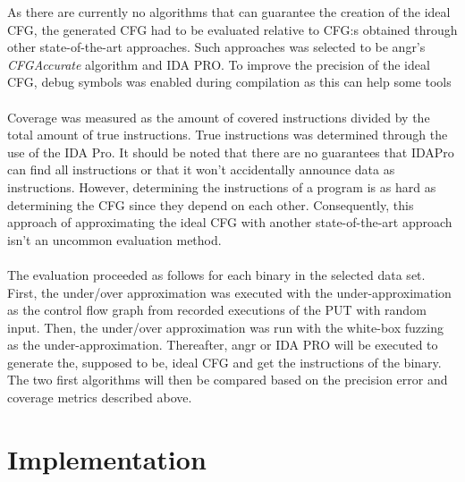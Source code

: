 \documentclass{kththesis}
\begin{document}
\noindent As there are currently no algorithms that can guarantee the creation of the ideal CFG, the generated CFG had to be evaluated relative to CFG:s obtained through other state-of-the-art approaches. Such approaches was selected to be angr's \textit{CFGAccurate} algorithm\cite{angr} and IDA PRO\cite{IDAPro}. To improve the precision of the ideal CFG, debug symbols was enabled during compilation as this can help some tools\cite{alternating}
\\ \\ 
Coverage was measured as the amount of covered instructions divided by the total amount of true instructions. True instructions was determined through the use of the IDA Pro. It should be noted that there are no guarantees that IDAPro can find all instructions or that it won't accidentally announce data as instructions. However, determining the instructions of a program is as hard as determining the CFG since they depend on each other. Consequently, this approach of approximating the ideal CFG with another state-of-the-art approach isn't an uncommon evaluation method\cite{alternating}\cite{preciseCFG}.%
\\ \\
The evaluation proceeded as follows for each binary in the selected data set. First, the under/over approximation was executed with the under-approximation as the control flow graph from recorded executions of the PUT with random input. Then, the under/over approximation was run with the white-box fuzzing as the under-approximation. Thereafter, angr or IDA PRO will be executed to generate the, supposed to be, ideal CFG and get the instructions of the binary. The two first algorithms will then be compared based on the precision error and coverage metrics described above.

\section{Implementation}


\end{document}
